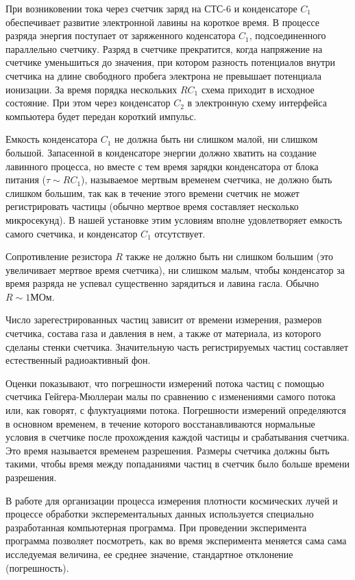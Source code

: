 \documentclass[a4paper,12pt]{article} %
\begin{document}
При возниковении тока через счетчик заряд на СТС-6 и конденсаторе $C_1$ обеспечивает развитие электронной лавины на короткое время. В процессе разряда энергия поступает от заряженного коденсатора $C_1$, подсоединенного параллельно счетчику. Разряд в счетчике прекратится, когда напряжение на счетчике уменьшиться до значения, при котором разность потенциалов внутри счетчика на длине свободного пробега электрона не превышает потенциала ионизации. За время порядка нескольких $RC_1$ схема приходит в исходное состояние. При этом через конденсатор $C_2$ в электронную схему интерфейса компьютера будет передан короткий импульс.

Емкость конденсатора $C_1$ не должна быть ни слишком малой, ни слишком большой. Запасенной в конденсаторе энергии должно хватить на создание лавинного процесса, но вместе с тем время зарядки конденсатора от блока питания ($\tau \sim RC_1$), называемое мертвым временем счетчика, не должно быть слишком большим, так как в течение этого времени счетчик не может регистрировать частицы (обычно мертвое время составляет несколько микросекунд). В нашей установке этим условиям вполне удовлетворяет емкость самого счетчика, и конденсатор $C_1$ отсутствует.

Сопротивление резистора $R$ также не должно быть ни слишком большим (это увеличивает мертвое время счетчика), ни слишком малым, чтобы конденсатор за время разряда не успевал существенно зарядиться и лавина гасла. Обычно $R \sim 1\text{МОм}$.

Число зарегестрированных частиц зависит от времени измерения, размеров счетчика, состава газа и давления в нем, а также от материала, из которого сделаны стенки счетчика. Значительную часть регистрируемых частиц составляет естественный радиоактивный фон.

Оценки показывают, что погрешности измерений потока частиц с помощью счетчика Гейгера-Мюллераи малы по сравнению с изменениями самого потока или, как говорят, с флуктуациями потока. Погрешности измерений определяются в основном временем, в течение которого восстанавливаются нормальные условия в счетчике после прохождения каждой частицы и срабатывания счетчика. Это время называется временем разрешения. Размеры счетчика должны быть такими, чтобы время между попаданиями частиц в счетчик было больше времени разрешения.

В работе для организации процесса измерения плотности космических лучей и процессе обработки эксперементальных данных используется специально разработанная компьютерная программа. При проведении эксперимента программа позволяет посмотреть, как во время эксперимента меняется сама сама исследуемая величина, ее среднее значение, стандартное отклонение (погрешность).
\end{document}
